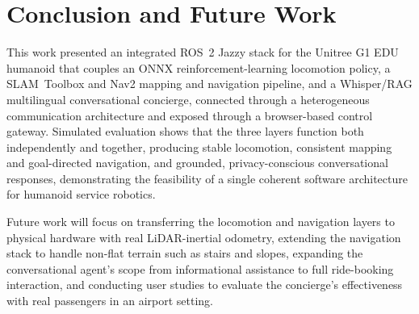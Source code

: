 \documentclass[10pt,twocolumn]{article}
\begin{document}
\section{Conclusion and Future Work}
This work presented an integrated ROS~2 Jazzy stack for the Unitree G1 EDU humanoid that couples an ONNX reinforcement-learning locomotion policy, a SLAM~Toolbox and Nav2 mapping and navigation pipeline, and a Whisper/RAG multilingual conversational concierge, connected through a heterogeneous communication architecture and exposed through a browser-based control gateway. Simulated evaluation shows that the three layers function both independently and together, producing stable locomotion, consistent mapping and goal-directed navigation, and grounded, privacy-conscious conversational responses, demonstrating the feasibility of a single coherent software architecture for humanoid service robotics.

Future work will focus on transferring the locomotion and navigation layers to physical hardware with real LiDAR-inertial odometry, extending the navigation stack to handle non-flat terrain such as stairs and slopes, expanding the conversational agent's scope from informational assistance to full ride-booking interaction, and conducting user studies to evaluate the concierge's effectiveness with real passengers in an airport setting.
\end{document}
